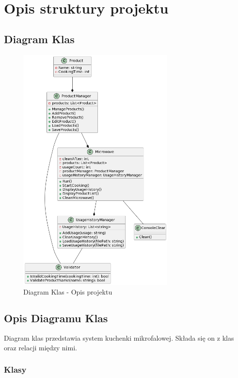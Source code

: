 \chapter{Opis struktury projektu}
\section{Diagram Klas}
\begin{figure}[h]
    \centering
    \includegraphics[width=0.7\textwidth]{Diagram.png}
      \caption{Diagram Klas - Opis projektu}
    \label{fig:example}
\end{figure}

\section{Opis Diagramu Klas}

Diagram klas przedstawia system kuchenki mikrofalowej. Składa się on z klas oraz relacji między nimi.

\subsection{Klasy}

